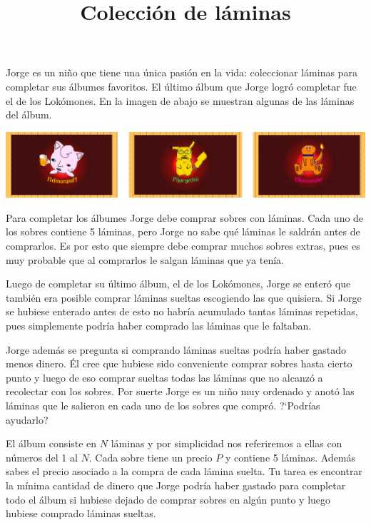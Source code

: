 \documentclass{oci}
\title{Colección de láminas}
\begin{document}
\begin{problemDescription}
Jorge es un niño que tiene una única pasión en la vida: coleccionar láminas para completar sus álbumes favoritos.
El último álbum que Jorge logró completar fue el de los Lokómones.
En la imagen de abajo se muestran algunas de las láminas del álbum.

\begin{center}
\includegraphics[scale=0.5]{locomons-laminas.png}
\end{center}

Para completar los álbumes Jorge debe comprar sobres con láminas.
Cada uno de los sobres contiene 5 láminas, pero Jorge no sabe qué láminas le saldrán antes de comprarlos.
Es por esto que siempre debe comprar muchos sobres extras, pues es muy probable que al comprarlos le salgan láminas que ya tenía.

Luego de completar su último álbum, el de los Lokómones, Jorge se enteró que también era posible comprar láminas sueltas escogiendo las que quisiera.
Si Jorge se hubiese enterado antes de esto no habría acumulado tantas láminas repetidas, pues simplemente podría haber comprado las láminas que le faltaban.

Jorge además se pregunta si comprando láminas sueltas podría haber gastado menos dinero.
Él cree que hubiese sido conveniente comprar sobres hasta cierto punto y luego de eso comprar sueltas todas las láminas que no alcanzó a recolectar con los sobres.
Por suerte Jorge es un niño muy ordenado y anotó las láminas que le salieron en cada uno de los sobres que compró. ?`Podrías ayudarlo?

El álbum consiste en $N$ láminas y por simplicidad nos referiremos a ellas con números del 1 al $N$.
Cada sobre tiene un precio $P$ y contiene 5 láminas.
Además sabes el precio asociado a la compra de cada lámina suelta.
Tu tarea es encontrar la mínima cantidad de dinero que Jorge podría haber gastado para completar todo el álbum si hubiese dejado de comprar sobres en algún punto y luego hubiese comprado láminas sueltas.
\end{problemDescription}
\end{document}
